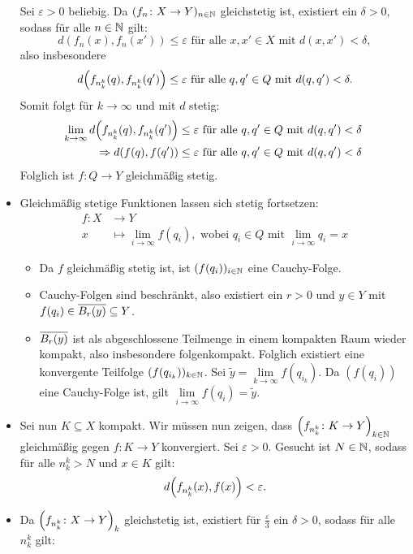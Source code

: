 \begin{beweis}
\begin{itemize}
		Sei $\varepsilon>0$ beliebig.
		Da $(f_n\colon X \rightarrow Y)_{n \in \NN}$ gleichstetig ist, existiert ein $\delta > 0$, sodass für alle $n \in \NN$ gilt:
		\[
			d(f_n(x),f_n(x')) \leq \varepsilon \text{ für alle } x,x' \in X \text{ mit } d(x,x') < \delta,
		\]
		also insbesondere
		\[
			d\enbrace*{f_{n_k^k}(q),f_{n_k^k}(q')} \leq \varepsilon \text{ für alle } q,q' \in Q \text{ mit } d(q,q') < \delta.
		\]
		Somit folgt für $k \rightarrow \infty$ und mit $d$ stetig:
		\begin{align*}
			\lim\limits_{k \rightarrow \infty} d\enbrace*{f_{n_k^k}(q),f_{n_k^k}(q')} &\leq \varepsilon \text{ für alle } q,q' \in Q \text{ mit } d(q,q') < \delta \\
			\Rightarrow d(f(q),f(q')) &\leq \varepsilon \text{ für alle } q,q' \in Q \text{ mit } d(q,q') < \delta \
		\end{align*}
		Folglich ist $f \colon Q \rightarrow Y$ gleichmäßig stetig.
		\item Gleichmäßig stetige Funktionen lassen sich stetig fortsetzen:
		\begin{align*}
			f \colon X &\longrightarrow Y \\
			x &\longmapsto \lim\limits_{i \rightarrow \infty} f(q_i), \text{ wobei } q_i \in Q \text{ mit } \lim\limits_{i \rightarrow \infty} q_i = x
		\end{align*}
		\begin{itemize}
			\item Da $f$ gleichmäßig stetig ist, ist $(f(q_i))_{i \in \NN}$ eine Cauchy-Folge.
			\item Cauchy-Folgen sind beschränkt, also existiert ein $r > 0$ und $y \in Y$ mit $f(q_i) \in \ol{B_r(y)} \subseteq Y$.
			\item $\ol{B_r(y)}$ ist als abgeschlossene Teilmenge in einem kompakten Raum wieder kompakt, also insbesondere folgenkompakt.
			Folglich existiert eine konvergente Teilfolge $(f(q_{i_k}))_{k \in \NN}$.
			Sei $\tilde{y} = \lim\limits_{k \rightarrow \infty} f(q_{i_k})$.
			Da $(f(q_i))$ eine Cauchy-Folge ist, gilt $\lim\limits_{i \rightarrow \infty} f(q_i) = \tilde{y}$.
		\end{itemize}
		\item Sei nun $K \subseteq X$ kompakt.
		Wir müssen nun zeigen, dass $\enbrace*{f_{n_k^k}\colon K \rightarrow Y}_{k \in \NN}$ gleichmäßig gegen $f \colon K \rightarrow Y$ konvergiert.
		Sei $\varepsilon > 0$.
		Gesucht ist $N \in \NN$, sodass für alle $n_k^k > N$ und $x \in K$ gilt:
		\[
			d\enbrace*{f_{n_k^k}(x),f(x)} < \varepsilon.
		\]
		\item Da $\enbrace*{f_{n_k^k} \colon X \rightarrow Y}_k$ gleichstetig ist, existiert für $\frac{\varepsilon}{3}$ ein $\delta > 0$, sodass für alle $n_k^k$ gilt:

\end{itemize}
\end{beweis}
